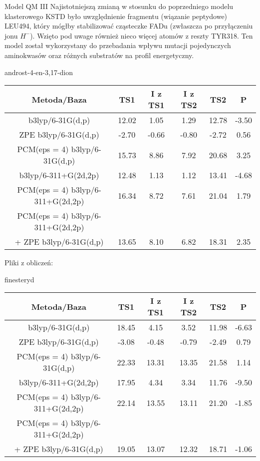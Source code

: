\begin{section}{Model QM III}
 Najistotniejszą zmianą w stosunku do poprzedniego modelu klasterowego KSTD było uwzględnienie fragmentu (wiązanie peptydowe) LEU494, który mógłby stabilizować cząsteczke FADu (zwłaszcza po przyłączeniu jonu
 $H^{-}$). Wzięto pod uwage również nieco więcej atomów z reszty TYR318. Ten model został wykorzystany do przebadania wpływu mutacji pojedynczych aminokwasów oraz różnych substratów na profil energetyczny.
 
  \begin{subsection}{androst-4-en-3,17-dion}
 
       \begin{tabular}{||c c c c c c||} 
 \hline
 Metoda/Baza & TS1 & I z TS1 & I z TS2 & TS2 & P \\ [0.5ex] 
 \hline\hline
b3lyp/6-31G(d,p) & 12.02 &  1.05 & 1.29 & 12.78 & -3.50 \\
ZPE b3lyp/6-31G(d,p) & -2.70  & -0.66 &  -0.80  & -2.72 & 0.56 \\
PCM(eps = 4) b3lyp/6-31G(d,p) & 15.73  & 8.86 & 7.92 & 20.68 & 3.25 \\
b3lyp/6-311+G(2d,2p) & 12.48  & 1.13  & 1.12 & 13.41 & -4.68 \\
PCM(eps = 4) b3lyp/6-311+G(2d,2p) & 16.34  & 8.72 & 7.61  & 21.04 & 1.79 \\
PCM(eps = 4) b3lyp/6-311+G(2d,2p) & & & & & \\ 
+ ZPE b3lyp/6-31G(d,p)  & 13.65  & 8.10  & 6.82 & 18.31 & 2.35 \\
 \hline
 
\end{tabular}

  
  Pliki z obliczeń:
 \end{subsection}
 
 \begin{subsection}{finesteryd}
 
       \begin{tabular}{||c c c c c c||} 
 \hline
 Metoda/Baza & TS1 & I z TS1 & I z TS2 & TS2 & P \\ [0.5ex] 
 \hline\hline
b3lyp/6-31G(d,p) & 18.45 &  4.15 & 3.52 & 11.98 & -6.63 \\
ZPE b3lyp/6-31G(d,p) & -3.08  & -0.48 &  -0.79  & -2.49 & 0.79 \\
PCM(eps = 4) b3lyp/6-31G(d,p) & 22.33  & 13.31 & 13.35 & 21.58 & 1.14 \\
b3lyp/6-311+G(2d,2p) & 17.95  & 4.34  & 3.34 & 11.76 & -9.50 \\
PCM(eps = 4) b3lyp/6-311+G(2d,2p) & 22.14  & 13.55 & 13.11  & 21.20 & -1.85 \\
PCM(eps = 4) b3lyp/6-311+G(2d,2p) & & & & & \\ 
+ ZPE b3lyp/6-31G(d,p)  & 19.05  & 13.07  & 12.32 & 18.71 & -1.06 \\
 \hline
 

\end{tabular}
\end{subsection}
\end{section}
